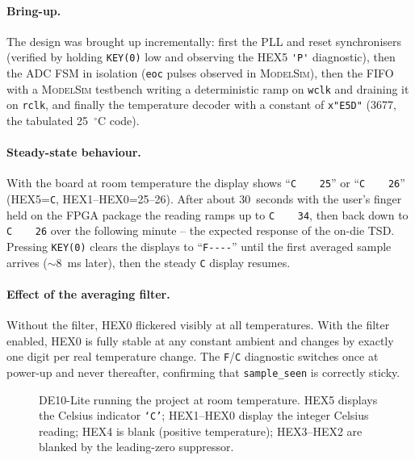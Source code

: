\documentclass[12pt,letterpaper]{article}
\begin{document}
\paragraph{Bring-up.}  The design was brought up incrementally: first the
PLL and reset synchronisers (verified by holding \texttt{KEY(0)} low and
observing the HEX5 \verb|'P'| diagnostic), then the ADC FSM in isolation
(\texttt{eoc} pulses observed in \textsc{ModelSim}), then the FIFO with a
\textsc{ModelSim} testbench writing a deterministic ramp on \texttt{wclk} and
draining it on \texttt{rclk}, and finally the temperature decoder with a
constant of \texttt{x"E5D"} (3677, the tabulated 25~$^\circ$C code).

\paragraph{Steady-state behaviour.}  With the board at room temperature the
display shows ``\verb|C    25|'' or ``\verb|C    26|'' (HEX5=\verb|C|,
HEX1--HEX0=25--26).  After about 30~seconds with the user's finger held on
the FPGA package the reading ramps up to \verb|C    34|, then back down to
\verb|C    26| over the following minute -- the expected response of the
on-die TSD.  Pressing \texttt{KEY(0)} clears the displays to ``\verb|F----|''
until the first averaged sample arrives ($\sim$8~ms later), then the steady
\verb|C| display resumes.

\paragraph{Effect of the averaging filter.}  Without the filter, HEX0
flickered visibly at all temperatures.  With the filter enabled, HEX0 is
fully stable at any constant ambient and changes by exactly one digit per
real temperature change.  The \verb|F|/\verb|C| diagnostic switches once at
power-up and never thereafter, confirming that \texttt{sample\_seen} is
correctly sticky.

\begin{figure}[h]
\centering
{}
\caption{DE10-Lite running the project at room temperature.  HEX5 displays
  the Celsius indicator \texttt{`C'}; HEX1--HEX0 display the integer
  Celsius reading; HEX4 is blank (positive temperature); HEX3--HEX2 are
  blanked by the leading-zero suppressor.}
\label{fig:photo}
\end{figure}
\end{document}
